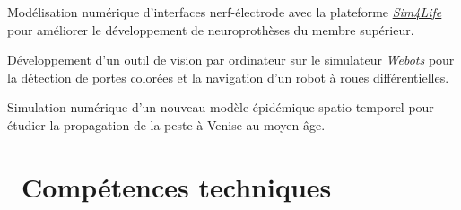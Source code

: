 \documentclass[a4paper]{cv}
\begin{document}
\begin{minipage}[t]{0.6\textwidth}
Modélisation numérique d’interfaces nerf-électrode avec la plateforme  \href{http://www.zurichmedtech.com/sim4life/}{\emph{Sim4Life}} pour améliorer le développement de neuroprothèses du membre supérieur.
\sectionspace

Développement d’un outil de vision par ordinateur sur le simulateur \href{https://www.cyberbotics.com/overview}{\emph{Webots}} pour la détection de portes colorées et la navigation d'un robot à roues différentielles.
\sectionspace

Simulation numérique d'un nouveau modèle épidémique spatio-temporel pour étudier la propagation de la peste à Venise au moyen-âge. 
\sectionspace

\section{\texorpdfstring{\faWrench}\ \ Compétences techniques}\sectionline




\end{minipage}
\end{document}
